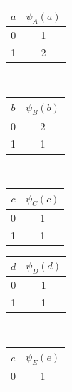 \documentclass[11pt,addpoints,answers]{exam}
\numberwithin{equation}{section} %
\numberwithin{figure}{section} %
\numberwithin{table}{section} %
\begin{document}
\begin{minipage}{.6\textwidth}

\begin{table}[H]
\centering
\begin{subtable}[t]{0.3\textwidth}
    \centering
    \begin{tabular}{cc} 
        \toprule
        $a$ & $\psi_{A}(a)$ \\
        \midrule
        0 & 1 \\
        1 & 2 \\ 
        \bottomrule
    \end{tabular}
\end{subtable}
~
\begin{subtable}[t]{0.3\textwidth}
    \centering
    \begin{tabular}{cc} 
        \toprule
        $b$ & $\psi_{B}(b)$ \\
        \midrule
        0 & 2 \\
        1 & 1 \\ 
        \bottomrule
    \end{tabular}
\end{subtable}
~
\begin{subtable}[t]{0.3\textwidth}
    \centering
    \begin{tabular}{cc} 
        \toprule
        $c$ & $\psi_{C}(c)$ \\
        \midrule
        0 & 1 \\
        1 & 1 \\ 
        \bottomrule
    \end{tabular}
\end{subtable}
\end{table}
\begin{table}[H]
\centering
\begin{subtable}[t]{0.3\textwidth}
    \centering
    \begin{tabular}{cc} 
        \toprule
        $d$ & $\psi_{D}(d)$ \\
        \midrule
        0 & 1 \\
        1 & 1 \\ 
        \bottomrule
    \end{tabular}
\end{subtable}
~
\begin{subtable}[t]{0.3\textwidth}
    \centering
    \begin{tabular}{cc} 
        \toprule
        $e$ & $\psi_{E}(e)$ \\
        \midrule
        0 & 1 \\

\end{tabular}
\end{subtable}
\end{table}
\end{minipage}
\end{document}
